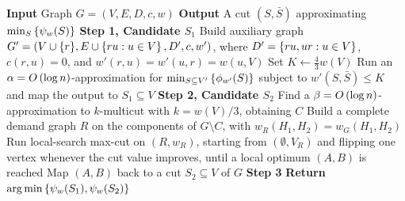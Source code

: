 \begin{algorithm}[H]
    \caption{Main algorithm for minimising $\psi_w$}
    \textbf{Input} Graph $G=(V,E,D,c,w)$\;
    \textbf{Output} A cut $(S,\bar S)$ approximating $\min_S\left\{\psi_w(S)\right\}$\;
    \textbf{Step 1, Candidate $S_1$}\;
    Build auxiliary graph $G'=(V\cup\{r\},E\cup\left\{ru:u\in V\right\},D',c,w')$, where $D'=\left\{ru,ur:u\in V\right\}$, $c(r,u)=0$, and $w'(r,u)=w'(u,r)=w(u,V)$\;
    Set $K\gets\tfrac{4}{3}w(V)$\;
    Run an $\alpha=O\left(\log n\right)$-approximation for $\min_{S\subseteq V'}\left\{\phi_{w'}(S)\right\}$ subject to $w'(S,\bar S)\leq K$ and map the output to $S_1\subseteq V$\;
    \textbf{Step 2, Candidate $S_2$}\;
    Find a $\beta=O\left(\log n\right)$-approximation to $k$-multicut with $k=w(V)/3$, obtaining $C$\;
    Build a complete demand graph $R$ on the components of $G\setminus C$, with $w_R(H_1,H_2)=w_G(H_1,H_2)$\;
    Run local-search max-cut on $(R,w_R)$, starting from $(\emptyset,V_R)$ and flipping one vertex whenever the cut value improves, until a local optimum $(A,B)$ is reached\;
    Map $(A,B)$ back to a cut $S_2\subseteq V$ of $G$\;
    \textbf{Step 3} \textbf{Return} $\arg\min\left\{\psi_w(S_1),\psi_w(S_2)\right\}$\;
\end{algorithm}
